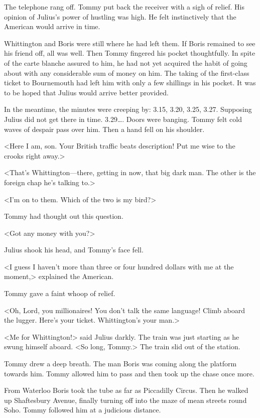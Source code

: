 The telephone rang off. Tommy put back the receiver with a sigh of relief. His opinion of Julius's power of hustling was high. He felt instinctively that the American would arrive in time.

Whittington and Boris were still where he had left them. If Boris remained to see his friend off, all was well. Then Tommy fingered his pocket thoughtfully. In spite of the carte blanche assured to him, he had not yet acquired the habit of going about with any considerable sum of money on him. The taking of the first-class ticket to Bournemouth had left him with only a few shillings in his pocket. It was to be hoped that Julius would arrive better provided.

In the meantime, the minutes were creeping by: 3.15, 3.20, 3.25, 3.27. Supposing Julius did not get there in time. 3.29\dots. Doors were banging. Tommy felt cold waves of despair pass over him. Then a hand fell on his shoulder.

<Here I am, son. Your British traffic beats description! Put me wise to the crooks right away.>

<That's Whittington—there, getting in now, that big dark man. The other is the foreign chap he's talking to.>

<I'm on to them. Which of the two is my bird?>

Tommy had thought out this question.

<Got any money with you?>

Julius shook his head, and Tommy's face fell.

<I guess I haven't more than three or four hundred dollars with me at the moment,> explained the American.

Tommy gave a faint whoop of relief.

<Oh, Lord, you millionaires! You don't talk the same language! Climb aboard the lugger. Here's your ticket. Whittington's your man.>

<Me for Whittington!> said Julius darkly. The train was just starting as he swung himself aboard. <So long, Tommy.> The train slid out of the station.

Tommy drew a deep breath. The man Boris was coming along the platform towards him. Tommy allowed him to pass and then took up the chase once more.

From Waterloo Boris took the tube as far as Piccadilly Circus. Then he walked up Shaftesbury Avenue, finally turning off into the maze of mean streets round Soho. Tommy followed him at a judicious distance.

